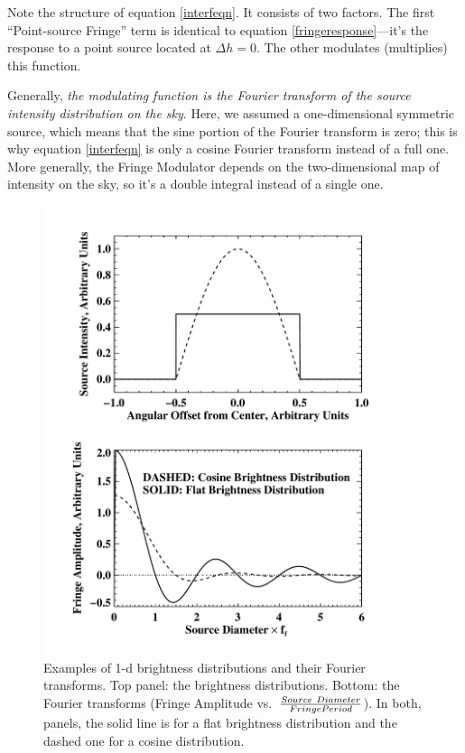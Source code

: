 \documentclass[11pt,preprint]{aastex}
\begin{document}
\noindent Note the structure of equation \ref{interfeqn}. It consists of
two factors. The first ``Point-source Fringe'' term is identical to equation
\ref{fringeresponse}---it's the response to a point source located at
$\Delta h=0$. The other modulates (multiplies) this function. 

Generally, {\it the modulating function is the Fourier transform of the
  source intensity distribution on the sky}.  Here, we assumed a
one-dimensional symmetric source, which means that the sine portion of
the Fourier transform is zero; this is why equation \ref{interfeqn} is
only a cosine Fourier transform instead of a full one.  More generally,
the Fringe Modulator depends on the two-dimensional map of intensity on
the sky, so it's a double integral instead of a single one.  
  
\begin{figure}[h!]
\begin{center}
\includegraphics[width=4.0in] {plots/cosfringe.pdf}
\end{center}
                                                                                
\caption{ \footnotesize Examples of 1-d brightness distributions and
  their Fourier transforms. Top panel: the brightness
  distributions. Bottom: the Fourier transforms (Fringe Amplitude
  vs.\ ${Source\ Diameter \over Fringe Period}$). In both, panels, the
  solid line is for a flat brightness distribution and the dashed one
  for a cosine distribution.
\label{cosfringe} } \end{figure}
\end{document}
